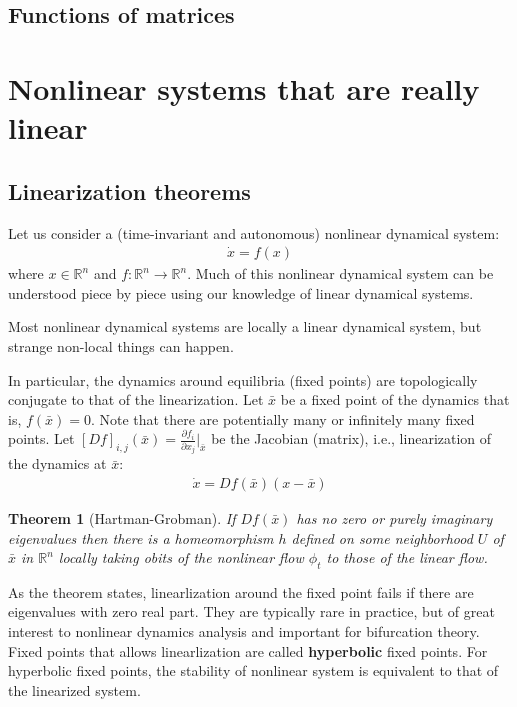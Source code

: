 \documentclass[a4paper,11pt]{exam}
\newtheorem{theorem}{Theorem}
\newcounter{ct}
\newcommand{\field}[1]{\ensuremath{\mathbb{#1}}}
\newcommand{\reals}{\field{R}}
\begin{document}
\begin{questions}
\subsection{Functions of matrices}
\section{Nonlinear systems that are really linear}
\subsection{Linearization theorems}
Let us consider a (time-invariant and autonomous) nonlinear dynamical system:
\begin{align}
    \dot{x} = f(x)
\end{align}
where $x \in \reals^n$ and $f: \reals^n \to \reals^n$.
Much of this nonlinear dynamical system can be understood piece by piece using our knowledge of linear dynamical systems.

\begin{tcolorbox}[colback=black!1!,title=Linearize that beast!]
    Most nonlinear dynamical systems are locally a linear dynamical system, but strange non-local things can happen.
\end{tcolorbox}

In particular, the dynamics around equilibria (fixed points) are topologically conjugate to that of the linearization.
Let $\bar{x}$ be a fixed point of the dynamics that is, $f(\bar{x}) = 0$.
Note that there are potentially many or infinitely many fixed points.
Let $[Df]_{i,j}(\bar{x}) = \frac{\partial f_i}{\partial x_j}\bigr\rvert_{\bar{x}}$ be the Jacobian (matrix), i.e., linearization of the dynamics at $\bar{x}$:
\begin{align}\label{eq:linearized_around_FP}
    \dot{x} = Df(\bar{x}) (x - \bar{x})
\end{align}


\begin{theorem}[Hartman-Grobman]
    If $Df(\bar{x})$ has no zero or purely imaginary eigenvalues then there is a homeomorphism $h$ defined on some neighborhood $U$ of $\bar{x}$ in $\reals^n$ locally taking obits of the nonlinear flow $\phi_t$ to those of the linear flow.
\end{theorem}
As the theorem states, linearlization around the fixed point fails if there are eigenvalues with zero real part.
They are typically rare in practice, but of great interest to nonlinear dynamics analysis and important for bifurcation theory.
Fixed points that allows linearlization are called \textbf{hyperbolic} fixed points.
For hyperbolic fixed points, the stability of nonlinear system is equivalent to that of the linearized system.


\end{questions}
\end{document}
